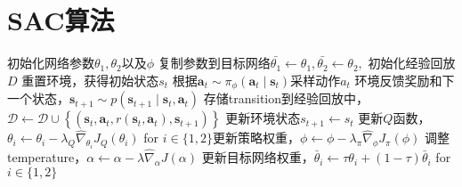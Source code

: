 \documentclass[11pt]{ctexart}
\begin{document}
\section{SAC算法}
\begin{algorithm}[H] %
    \renewcommand{\thealgorithm}{} %
	\caption{} 
	\begin{algorithmic}[1]
		\STATE 初始化网络参数$\theta_1,\theta_2$以及$\phi$ %
		\STATE 复制参数到目标网络$\bar{\theta_1} \leftarrow \theta_1,\bar{\theta_2} \leftarrow \theta_2,$
		\STATE 初始化经验回放$D$
			\STATE 重置环境，获得初始状态$s_t$
				\STATE 根据$\boldsymbol{a}_{t} \sim \pi_{\phi}\left(\boldsymbol{a}_{t} \mid \mathbf{s}_{t}\right)$采样动作$a_t$
				\STATE 环境反馈奖励和下一个状态，$\mathbf{s}_{t+1} \sim p\left(\mathbf{s}_{t+1} \mid \mathbf{s}_{t}, \mathbf{a}_{t}\right)$
				\STATE 存储transition到经验回放中，$\mathcal{D} \leftarrow \mathcal{D} \cup\left\{\left(\mathbf{s}_{t}, \mathbf{a}_{t}, r\left(\mathbf{s}_{t}, \mathbf{a}_{t}\right), \mathbf{s}_{t+1}\right)\right\}$
				\STATE 更新环境状态$s_{t+1} \leftarrow s_t$
				\STATE 更新$Q$函数，$\theta_{i} \leftarrow \theta_{i}-\lambda_{Q} \hat{\nabla}_{\theta_{i}} J_{Q}\left(\theta_{i}\right)$ for $i \in\{1,2\}$\footnotemark[2]\footnotemark[3]
				\STATE 更新策略权重，$\phi \leftarrow \phi-\lambda_{\pi} \hat{\nabla}_{\phi} J_{\pi}(\phi)$ \footnotemark[4]
				\STATE 调整temperature，$\alpha \leftarrow \alpha-\lambda \hat{\nabla}_{\alpha} J(\alpha)$ \footnotemark[5]
				\STATE 更新目标网络权重，$\bar{\theta}_{i} \leftarrow \tau \theta_{i}+(1-\tau) \bar{\theta}_{i}$ for $i \in\{1,2\}$
			\ENDFOR
		\ENDFOR
	\end{algorithmic}	
\end{algorithm}
\end{document}
